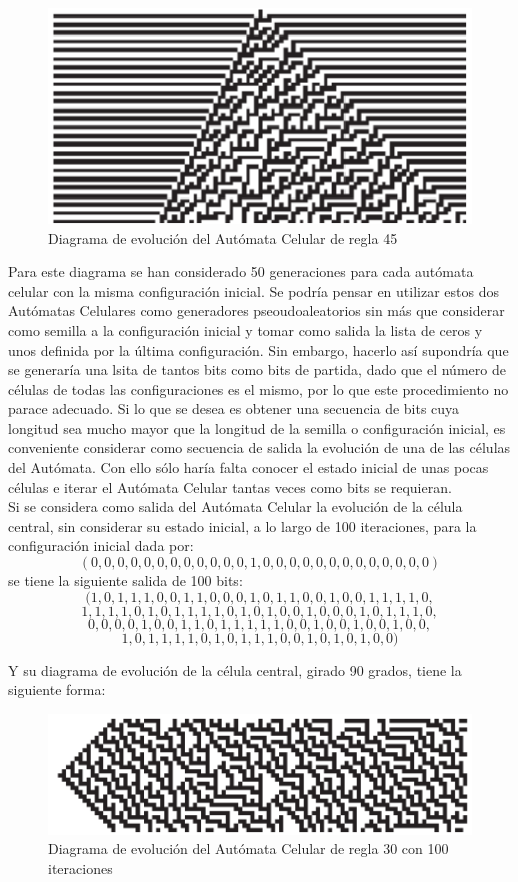 \begin{figure}[H]
\centering
\includegraphics[scale=0.7]{imagenes/regla_45.png}
\caption{Diagrama de evolución del Autómata Celular de regla 45}
\end{figure}

Para este diagrama se han considerado 50 generaciones para cada autómata celular con la misma configuración inicial. Se podría pensar en utilizar estos dos Autómatas Celulares como generadores pseoudoaleatorios sin más que considerar como semilla a la configuración inicial y tomar como salida la lista de ceros y unos definida por la última configuración. Sin embargo, hacerlo así supondría que se generaría una lsita de tantos bits  como bits de partida, dado que el número de células de todas las configuraciones es el mismo, por lo que este procedimiento no parace adecuado. Si lo que se desea es obtener una secuencia de bits cuya longitud sea mucho mayor que la longitud de la semilla o configuración inicial, es conveniente considerar como secuencia de salida la evolución de una de las células del Autómata. Con ello sólo haría falta conocer el estado inicial de unas pocas células e iterar el Autómata Celular tantas veces como bits se requieran.\\

Si se considera como salida del Autómata Celular la evolución de la célula central, sin considerar su estado inicial, a lo largo de 100 iteraciones, para la configuración inicial dada por:
$$(0,0,0,0,0,0,0,0,0,0,0,0,1,0,0,0,0,0,0,0,0,0,0,0,0,0)$$
se tiene la siguiente salida de 100 bits:
$$(1,0,1,1,1,0,0,1,1,0,0,0,1,0,1,1,0,0,1,0,0,1,1,1,1,0,$$
$$1,1,1,1,0,1,0,1,1,1,1,0,1,0,1,0,0,1,0,0,0,1,0,1,1,1,0,$$
$$0,0,0,0,1,0,0,1,1,0,1,1,1,1,1,0,0,1,0,0,1,0,0,1,0,0,$$
$$1,0,1,1,1,1,0,1,0,1,1,1,0,0,1,0,1,0,1,0,0)$$

Y su diagrama de evolución de la célula central, girado 90 grados, tiene la siguiente forma:

\begin{figure}[H]
\centering
\includegraphics[scale=0.7]{imagenes/regla_30_100.png}
\caption{Diagrama de evolución del Autómata Celular de regla 30 con 100 iteraciones}
\end{figure}


